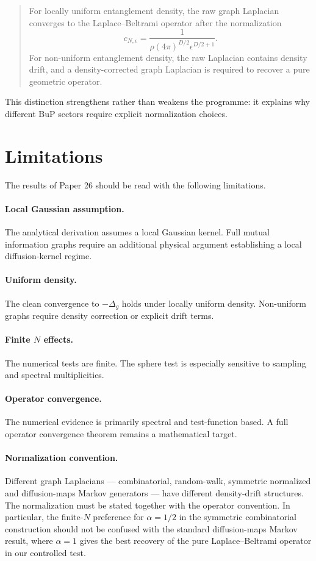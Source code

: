 \documentclass[11pt,a4paper]{article}
\begin{document}
\begin{quote}
For locally uniform entanglement density, the raw graph Laplacian converges to
the Laplace--Beltrami operator after the normalization
\[
c_{N,\epsilon}
=
\frac{1}
{\rho(4\pi)^{D/2}\epsilon^{D/2+1}}.
\]
For non-uniform entanglement density, the raw Laplacian contains density drift,
and a density-corrected graph Laplacian is required to recover a pure geometric
operator.
\end{quote}

This distinction strengthens rather than weakens the programme: it explains why
different BuP sectors require explicit normalization choices.

\section{Limitations}

The results of Paper 26 should be read with the following limitations.

\paragraph{Local Gaussian assumption.}
The analytical derivation assumes a local Gaussian kernel. Full mutual
information graphs require an additional physical argument establishing a local
diffusion-kernel regime.

\paragraph{Uniform density.}
The clean convergence to \(-\Delta_g\) holds under locally uniform density.
Non-uniform graphs require density correction or explicit drift terms.

\paragraph{Finite \(N\) effects.}
The numerical tests are finite. The sphere test is especially sensitive to
sampling and spectral multiplicities.

\paragraph{Operator convergence.}
The numerical evidence is primarily spectral and test-function based. A full
operator convergence theorem remains a mathematical target.

\paragraph{Normalization convention.}
Different graph Laplacians --- combinatorial, random-walk, symmetric normalized
and diffusion-maps Markov generators --- have different density-drift
structures. The normalization must be stated together with the operator
convention. In particular, the finite-\(N\) preference for \(\alpha=1/2\) in the
symmetric combinatorial construction should not be confused with the standard
diffusion-maps Markov result, where \(\alpha=1\) gives the best recovery of the
pure Laplace--Beltrami operator in our controlled test.
\end{document}
